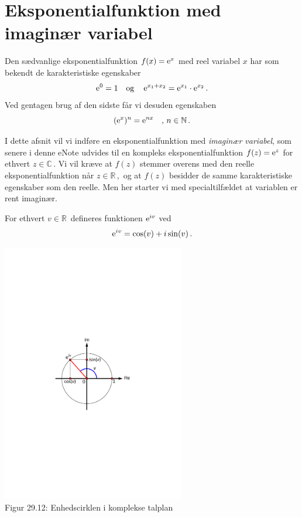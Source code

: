 
\section{Eksponentialfunktion med imaginær variabel}

Den sædvanlige eksponentialfunktion $f(x)=\mathrm{e}^x$ med reel variabel $x$ har som bekendt de karakteristiske egenskaber 
\begin{equation}
\mathrm{e}^0=1\quad \mathrm{og} \quad\,\mathrm{e}^{x_1+x_2}=\mathrm{e}^{x_1}\cdot\mathrm{e}^{x_2}\,.
\end{equation}
Ved gentagen brug af den sidste får vi desuden  egenskaben 
\begin{equation}
(\mathrm{e}^{x})^n=\mathrm{e}^{nx}\quad ,\,n\in \mathbb N\,.
\end{equation}

I dette afsnit vil vi indføre en  eksponentialfunktion med \textit{imaginær variabel}, som senere i denne eNote udvides til en kompleks eksponentialfunktion $f(z)=\mathrm{e}^z$ for ethvert $z\in \mathbb C\,$. Vi vil kræve at $f(z)$ stemmer overens med den reelle eksponentialfunktion når $z\in \mathbb R\,,$ og at $f(z)$ besidder de samme karakteristiske egenskaber som den reelle. Men her starter vi med specialtilfældet at variablen er rent imaginær.

\begin{definition}\label{tn29_eiy}
For ethvert $v\in \mathbb R\,$ defineres funktionen  $\mathrm{e}^{iv}$ ved
\begin{equation}
\mathrm{e}^{iv}=\cos(v)+i\sin(v)\,.
\end{equation}
\begin{center}
	\includegraphics[trim=3cm 10.7cm 3cm 10.7cm,width=0.6\textwidth,clip]{Geometer/exp_iv.pdf}\\
Figur 29.12: Enhedscirklen i komplekse talplan 
\end{center}
\end{definition}

